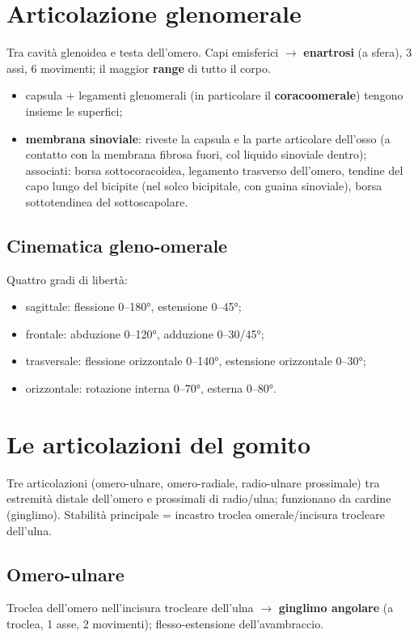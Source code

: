\section{Articolazione glenomerale}

Tra cavità glenoidea e testa dell'omero. Capi emisferici $\rightarrow$ \textbf{enartrosi} (a sfera),
3 assi, 6 movimenti; il maggior \textbf{range} di tutto il corpo.
\begin{itemize}
  \item capsula + legamenti glenomerali (in particolare il \textbf{coracoomerale}) tengono insieme
    le superfici;
  \item \textbf{membrana sinoviale}: riveste la capsula e la parte articolare dell'osso (a contatto
    con la membrana fibrosa fuori, col liquido sinoviale dentro); associati: borsa sottocoracoidea,
    legamento trasverso dell'omero, tendine del capo lungo del bicipite (nel solco bicipitale, con
    guaina sinoviale), borsa sottotendinea del sottoscapolare.
\end{itemize}

\subsection{Cinematica gleno-omerale}
Quattro gradi di libertà:
\begin{itemize}
  \item sagittale: flessione 0--180°, estensione 0--45°;
  \item frontale: abduzione 0--120°, adduzione 0--30/45°;
  \item trasversale: flessione orizzontale 0--140°, estensione orizzontale 0--30°;
  \item orizzontale: rotazione interna 0--70°, esterna 0--80°.
\end{itemize}

\section{Le articolazioni del gomito}

Tre articolazioni (omero-ulnare, omero-radiale, radio-ulnare prossimale) tra estremità distale
dell'omero e prossimali di radio/ulna; funzionano da cardine (ginglimo). Stabilità principale =
incastro troclea omerale/incisura trocleare dell'ulna.

\subsection{Omero-ulnare}
Troclea dell'omero nell'incisura trocleare dell'ulna $\rightarrow$ \textbf{ginglimo angolare} (a
troclea, 1 asse, 2 movimenti); flesso-estensione dell'avambraccio.

